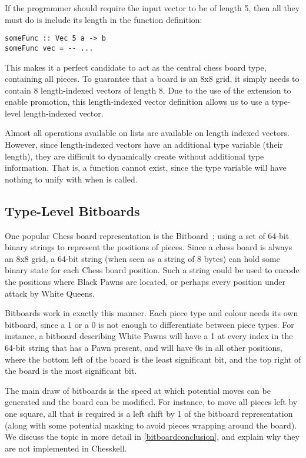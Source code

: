 If the programmer should require the input vector to be of length 5, then all they must do is include its length in the function definition:

\begin{lstlisting}
someFunc :: Vec 5 a -> b
someFunc vec = -- ...
\end{lstlisting}

This makes it a perfect candidate to act as the central chess board type, containing all pieces. To guarantee that a board is an 8x8 grid, it simply needs to contain 8 length-indexed vectors of length 8. Due to the use of the  extension to enable promotion, this length-indexed vector definition allows us to use a type-level length-indexed vector.

Almost all operations available on lists are available on length indexed vectors. However, since length-indexed vectors have an additional type variable (their length), they are difficult to dynamically create without additional type information. That is, a function  cannot exist, since the type variable  will have nothing to unify with when  is called.

\subsection{Type-Level Bitboards}

One popular Chess board representation is the Bitboard~\cite{bitboard}; using a set of 64-bit binary strings to represent the positions of pieces. Since a chess board is always an 8x8 grid, a 64-bit string (when seen as a string of 8 bytes) can hold some binary state for each Chess board position. Such a string could be used to encode the positions where Black Pawns are located, or perhaps every position under attack by White Queens.

Bitboards work in exactly this manner. Each piece type and colour needs its own bitboard, since a 1 or a 0 is not enough to differentiate between piece types. For instance, a bitboard describing White Pawns will have a 1 at every index in the 64-bit string that has a Pawn present, and will have 0s in all other positions, where the bottom left of the board is the least significant bit, and the top right of the board is the most significant bit.

The main draw of bitboards is the speed at which potential moves can be generated and the board can be modified. For instance, to move all pieces left by one square, all that is required is a left shift by 1 of the bitboard representation (along with some potential masking to avoid pieces wrapping around the board). We discuss the topic in more detail in \cref{bitboardconclusion}, and explain why they are not implemented in Chesskell.

